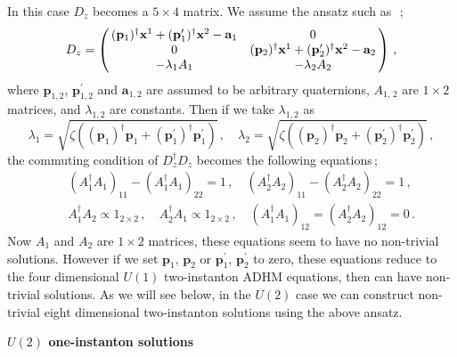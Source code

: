 \documentclass[a4paper,12pt]{article}
\begin{document}
In this case $D_z$ becomes a $5\times 4$ matrix. 
We assume the ansatz such as~\cite{pt}\,;
\begin{equation}
D_z =
 \left( \begin{array}{@{\,}cc@{\,}}
 (\mathbf{p}_1)^{\dagger}\mathbf{x}^1 +(\mathbf{p}_1^{\prime})^{\dagger}
\mathbf{x}^2 -\mathbf{a}_1 & 0 \\
 0 & (\mathbf{p}_2)^{\dagger}\mathbf{x}^1 
+(\mathbf{p}_2^{\prime})^{\dagger}\mathbf{x}^2 -\mathbf{a}_2 \\
 -\lambda_1 A_{1}  &  -\lambda_2 A_{2} 
  \end{array}  \right)\,,
\end{equation}
where $\mathbf{p}_{1,2}$, $\mathbf{p}^{\prime}_{1,2}$ 
and $\mathbf{a}_{1,2}$ are assumed 
to be arbitrary quaternions, $A_{1,\,2}$ are $1\times 2$ matrices, and 
$\lambda_{1,2}$ are constants.
Then if we take $\lambda_{1,2}$ as
\begin{equation}
\lambda _1 = \sqrt{ \zeta \left( (\mathbf{p}_1)^{\dagger}\mathbf{p}_1+
 (\mathbf{p}_1^{\prime})^{\dagger}\mathbf{p}_1^{\prime} \right)}\,,\quad
\lambda _2 = \sqrt{ \zeta \left( (\mathbf{p}_2)^{\dagger}\mathbf{p}_2+
 (\mathbf{p}_2^{\prime})^{\dagger}\mathbf{p}_2^{\prime}   \right)}\,,
\end{equation}
the commuting condition of $D_z^{\dagger}D_z$ becomes the following 
equations\,;
\begin{eqnarray}
& &  (A_{1}^{\dagger}A_{1})_{11}-
 (A_{1}^{\dagger}A_{1})_{22} =  1\,,\quad
  (A_{2}^{\dagger}A_{2})_{11}-
 (A_{2}^{\dagger}A_{2})_{22}  = 1 \,, \\
& & A_{1}^{\dagger}A_{2}\propto 1_{2\times 2}\,,
\quad  A_{2}^{\dagger}A_{1}\propto 1_{2\times 2}\,,\quad 
(A_{1}^{\dagger}A_{1})_{12}=(A_{2}^{\dagger}A_{2})_{12}=0\,.
\end{eqnarray}
Now $A_{1}$ and $A_{2}$ are $1\times 2$ matrices, 
these equations seem to have no non-trivial solutions.
However if we set $\mathbf{p}_1,\,\mathbf{p}_2$ or
$\mathbf{p}_1^{\prime},\,\mathbf{p}_2^{\prime}$ to zero, 
these equations reduce to the four dimensional $U(1)$ two-instanton 
ADHM equations, then can have non-trivial solutions. 
As we will see below, in the $U(2)$ case we can construct non-trivial 
eight dimensional two-instanton solutions using the above ansatz.



\begin{flushleft}
\textbf{$U(2)$ one-instanton solutions}
\end{flushleft}
\end{document}
